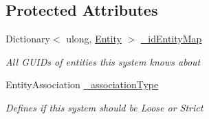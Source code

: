 \subsection*{Protected Attributes}
\begin{DoxyCompactItemize}
\item 
Dictionary$<$ ulong, \hyperlink{class_midnight_blue_1_1_engine_1_1_entity_component_1_1_entity}{Entity} $>$ \hyperlink{class_midnight_blue_1_1_engine_1_1_entity_component_1_1_entity_system_ad1760cf695261ba2f87740d0fd1e0e8c}{\+\_\+id\+Entity\+Map}
\begin{DoxyCompactList}\small\item\em All G\+U\+ID\textquotesingle{}s of entities this system knows about \end{DoxyCompactList}\item 
Entity\+Association \hyperlink{class_midnight_blue_1_1_engine_1_1_entity_component_1_1_entity_system_a938cb3fb0fca73406472f0c44be8641e}{\+\_\+association\+Type}
\begin{DoxyCompactList}\small\item\em Defines if this system should be Loose or Strict \end{DoxyCompactList}\end{DoxyCompactItemize}
